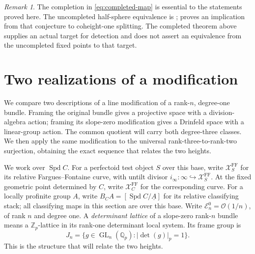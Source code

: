 \documentclass[11pt]{article}
\numberwithin{equation}{section}
\theoremstyle{definition}
\theoremstyle{remark}
\newtheorem{remark}[theorem]{Remark}
\begin{document}
\begin{remark}
The completion in \eqref{eq:completed-map} is essential to the statements
proved here.  The uncompleted half-sphere equivalence is
\cite[Conjectures 1.1.1 and 5.1.13]{BMR2026};
\cite[Proposition 5.1.17]{BMR2026} proves an implication from that
conjecture to coheight-one splitting.  The completed theorem above
supplies an actual target for detection and does not assert an
equivalence from the uncompleted fixed points to that target.
\end{remark}

\section{Two realizations of a modification}\label{sec:modifications}

We compare two descriptions of a line modification of a rank-$n$,
degree-one bundle. Framing the original bundle gives a projective
space with a division-algebra action; framing its slope-zero
modification gives a Drinfeld space with a linear-group action.
The common quotient will carry both degree-three classes. We then
apply the same modification to the universal rank-three-to-rank-two
surjection, obtaining the exact sequence that relates the two heights.

We work over $\operatorname{Spd} C$.  For a perfectoid test object $S$ over this
base, write $\mathcal X_S^{\mathrm{FF}}$ for its relative
Fargues--Fontaine curve, with untilt divisor
$i_\infty:\infty\hookrightarrow\mathcal X_S^{\mathrm{FF}}$.
At the fixed geometric point determined by $C$, write
$\mathcal X_C^{\mathrm{FF}}$ for the corresponding curve.
For a locally profinite group $A$, write
$B_CA=[\operatorname{Spd} C/\underline A]$ for its relative classifying stack;
all classifying maps in this section are over this base.
Write $\mathcal E_n^0=\mathcal O(1/n)$, of rank $n$ and degree one.
A \emph{determinant lattice} of a slope-zero rank-$n$ bundle means a
$\mathbb Z_p$-lattice in its rank-one determinant local system.
Its frame group is
\[
 J_n=\{g\in\operatorname{GL}_n(\mathbb Q_p):|\det(g)|_p=1\}.
\]
This is the structure that will relate the two heights.
\end{document}
